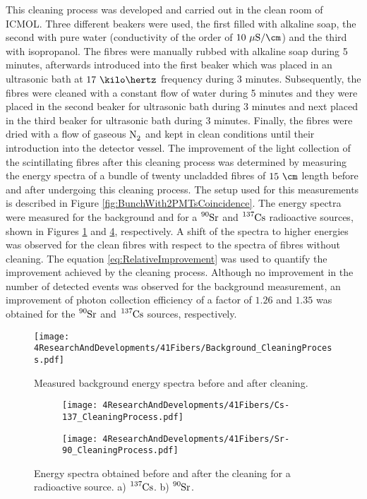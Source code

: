 This cleaning process  was developed and carried out in the clean room of ICMOL. Three different beakers were used, the first filled with alkaline soap, the second with pure water (conductivity of the order of $10~\mu\text{S}/\cm$) and the third with isopropanol. The fibres were manually rubbed with alkaline soap during 5 minutes, afterwards introduced into the first beaker which was placed in an ultrasonic bath at $17~\kilo\hertz$ frequency during 3 minutes. Subsequently, the fibres were cleaned with a constant flow of water during 5 minutes and they were placed in the second beaker for ultrasonic bath during 3 minutes and next placed in the third beaker for ultrasonic bath during 3 minutes. Finally, the fibres were dried with a flow of gaseous $\ce{N_2}$ and kept in clean conditions until their introduction into the detector vessel. The improvement of the light collection of the scintillating fibres after this cleaning process was determined by measuring the energy spectra of a bundle of twenty uncladded fibres of $15~\cm$ length before and after undergoing this cleaning process. The setup used for this measurements is described in Figure \ref{fig:BunchWith2PMTsCoincidence}. The energy spectra were measured for the background and for a $\ce{^{90}Sr}$ and $\ce{^{137}Cs}$ radioactive sources, shown in Figures \ref{fig:ResultsOfCleaningProcessBackground} and \ref{fig:ResultsOfCleaningProcessSource}, respectively. A shift of the spectra to higher energies was observed for the clean fibres with respect to the spectra of fibres without cleaning. The equation \ref{eq:RelativeImprovement} was used to quantify the improvement achieved by the cleaning process. Although no improvement in the number of detected events was observed for the background measurement, an improvement of photon collection efficiency of a factor of $1.26$ and $1.35$ was obtained for the $\ce{^{90}Sr}$ and $\ce{^{137}Cs}$ sources, respectively.

\begin{figure}[h]
\centering
\texttt{[image: 4ResearchAndDevelopments/41Fibers/Background\_CleaningProcess.pdf]}
\caption{Measured background energy spectra before and after cleaning.\label{fig:ResultsOfCleaningProcessBackground}}
\end{figure}

\begin{figure}
\centering
    \begin{subfigure}[b]{1\textwidth}
    \centering
    \texttt{[image: 4ResearchAndDevelopments/41Fibers/Cs-137\_CleaningProcess.pdf]}  
    \caption{\label{subfig:EnergySpectrumCo60CleaningTest}}
    \end{subfigure}
    \hfill
    \begin{subfigure}[b]{1\textwidth}
    \centering
    \texttt{[image: 4ResearchAndDevelopments/41Fibers/Sr-90\_CleaningProcess.pdf]}  
    \caption{\label{subfig:EnergySpectrumSr90CleaningTest}}
    \end{subfigure}
 \caption{Energy spectra obtained before and after the cleaning for a radioactive source. a) $\ce{^{137}Cs}$. b) $\ce{^{90}Sr}$.}
 \label{fig:ResultsOfCleaningProcessSource}
\end{figure}


